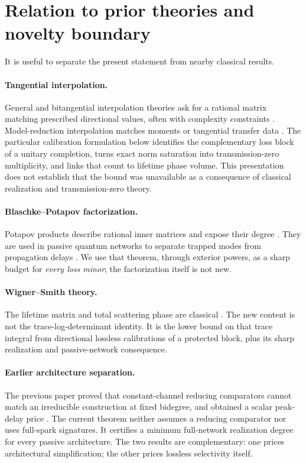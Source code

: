 \documentclass[11pt]{article}
\theoremstyle{definition}
\theoremstyle{remark}
\begin{document}
\section{Relation to prior theories and novelty boundary}

It is useful to separate the present statement from nearby classical results.

\paragraph{Tangential interpolation.}
General and bitangential interpolation theories ask for a rational matrix
matching prescribed directional values, often with complexity constraints
\cite{BallKang1990,BallBolotnikov2017}.  Model-reduction interpolation matches
moments or tangential transfer data \cite{GallivanEtAl2004}.  The particular calibration formulation below identifies the complementary loss block of a unitary
completion, turns exact norm saturation into transmission-zero multiplicity,
and links that count to lifetime phase volume. This presentation does not
establish that the bound was unavailable as a consequence of classical
realization and transmission-zero theory.

\paragraph{Blaschke--Potapov factorization.}
Potapov products describe rational inner matrices and expose their degree
\cite{Potapov1955,AlpayJorgensenLewkowicz2016}.  They are used in passive
quantum networks to separate trapped modes from propagation delays
\cite{TabakMabuchi2016}.  We use that theorem, through exterior powers, as a
sharp budget for \emph{every loss minor}; the factorization itself is not new.

\paragraph{Wigner--Smith theory.}
The lifetime matrix and total scattering phase are classical
\cite{Wigner1955,Smith1960}.  The new content is not the trace-log-determinant
identity.  It is the lower bound on that trace integral from directional
lossless calibrations of a protected block, plus its sharp realization and
passive-network consequence.

\paragraph{Earlier architecture separation.}
The previous paper proved that constant-channel reducing comparators cannot
match an irreducible construction at fixed bidegree, and obtained a scalar
peak-delay price \cite{ErikssonReservoir2026}.  The current theorem neither
assumes a reducing comparator nor uses full-spark signatures.  It certifies a
minimum full-network realization degree for every passive architecture.  The
two results are complementary: one prices architectural simplification; the
other prices lossless selectivity itself.
\end{document}
